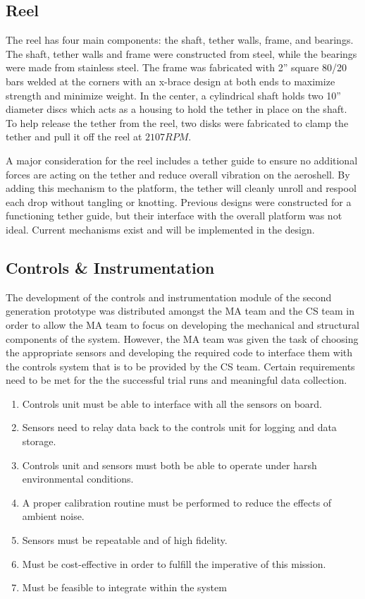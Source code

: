 \subsection{Reel}

\indent\indent The reel has four main components: the shaft, tether walls, frame, and bearings. The shaft, tether walls and frame were constructed from steel, while the bearings were made from stainless steel. The frame was fabricated with 2” square 80/20 bars welded at the corners with an x-brace design at both ends to maximize strength and minimize weight. In the center, a cylindrical shaft holds two 10” diameter discs which acts as a housing to hold the tether in place on the shaft. To help release the tether from the reel, two disks were fabricated to clamp the tether and pull it off the reel at $2107 RPM$.

\indent A major consideration for the reel includes a tether guide to ensure no additional forces are
acting on the tether and reduce overall vibration on the aeroshell. By adding this mechanism to the platform, the tether will cleanly unroll and respool each drop without tangling or knotting. Previous designs were constructed for a functioning tether guide, but their interface with the overall platform was not ideal. Current mechanisms exist and will be implemented in the design.

\subsection{Controls \& Instrumentation}

\indent\indent The development of the controls and instrumentation module of the second generation prototype was distributed amongst the MA team and the CS team in order to allow the MA team to focus on developing the mechanical and structural components of the system. However, the MA team was given the task of choosing the appropriate sensors and developing the required code to interface them with the controls system that is to be provided by the CS team.
Certain requirements need to be met for the the successful trial runs and meaningful data collection.

\begin{enumerate}
\item Controls unit must be able to interface with all the sensors on board.
\item Sensors need to relay data back to the controls unit for logging and data storage.
\item Controls unit and sensors must both be able to operate under harsh environmental conditions.
\item A proper calibration routine must be performed to reduce the effects of ambient noise.
\item Sensors must be repeatable and of high fidelity.
\item Must be cost-effective in order to fulfill the imperative of this mission.
\item Must be feasible to integrate within the system
\end{enumerate}

